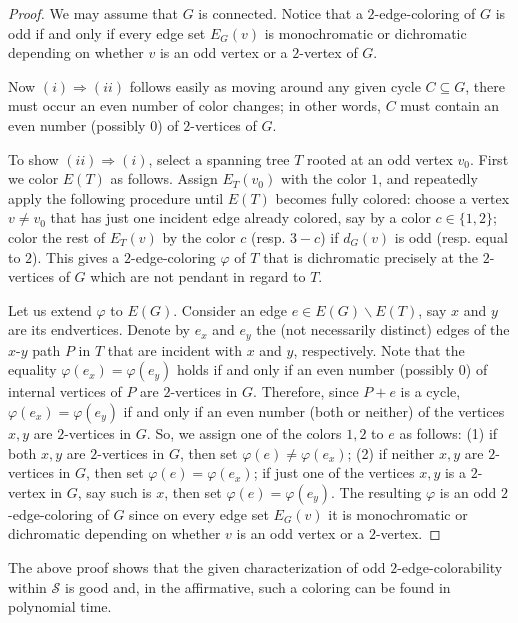 \documentclass[a4paper,12pt]{article}
\numberwithin{equation}{section}
\begin{document}
\begin{proof}
We may assume that $G$ is connected. Notice that a $2$-edge-coloring of $G$ is odd if and only if every edge set $E_G(v)$ is monochromatic or dichromatic depending on whether $v$ is an odd vertex or a $2$-vertex of $G$.

Now $(i)\Rightarrow (ii)$ follows easily as moving around any given cycle $C\subseteq G$, there must occur an even number of color changes; in other words, $C$ must contain an even number (possibly $0$) of $2$-vertices of $G$.

To show $(ii)\Rightarrow (i)$, select a spanning tree $T$ rooted at an odd vertex $v_0$. First we color $E(T)$ as follows. Assign $E_T(v_0)$ with the color $1$, and repeatedly apply the following procedure until $E(T)$ becomes fully colored: choose a vertex $v\neq v_0$ that has just one incident edge already colored, say by a color $c\in\{1,2\}$; color the rest of $E_T(v)$ by the color $c$ (resp. $3-c$) if $d_G(v)$ is odd (resp. equal to $2$). This gives a $2$-edge-coloring $\varphi$ of $T$ that is dichromatic precisely at the $2$-vertices of $G$ which are not pendant in regard to $T$.

Let us extend $\varphi$ to $E(G)$. Consider an edge $e\in E(G)\backslash E(T)$, say $x$ and $y$ are its endvertices. Denote by $e_x$ and $e_y$ the (not necessarily distinct) edges of the $x$-$y$ path $P$ in $T$ that are incident with $x$ and $y$, respectively. Note that the equality $\varphi(e_x)=\varphi(e_y)$ holds if and only if an even number (possibly $0$) of internal vertices of $P$ are $2$-vertices in $G$. Therefore, since $P+e$ is a cycle, $\varphi(e_x)=\varphi(e_y)$ if and only if an even number (both or neither) of the vertices $x,y$ are $2$-vertices in $G$. So, we assign one of the colors $1,2$ to $e$ as follows: (1) if both $x,y$ are $2$-vertices in $G$, then set $\varphi(e)\neq \varphi(e_x)$; (2) if neither $x,y$ are $2$-vertices in $G$, then set $\varphi(e)=\varphi(e_x)$; if just one of the vertices $x,y$ is a $2$-vertex in $G$, say such is $x$, then set $\varphi(e)=\varphi(e_y)$. The resulting $\varphi$ is an odd $2$-edge-coloring of $G$ since on every edge set $E_G(v)$ it is monochromatic or dichromatic depending on whether $v$ is an odd vertex or a $2$-vertex.
\end{proof}

The above proof shows that the given characterization of odd $2$-edge-colorability within $\mathcal{S}$ is good and, in the affirmative, such a coloring can be found in polynomial time.
\end{document}
